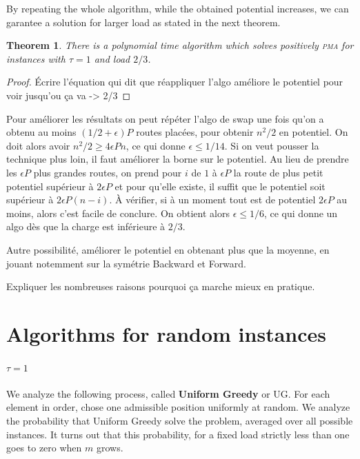 \documentclass[10pt, conference, letterpaper]{IEEEtran}
\newtheorem{theorem}{Theorem}
\newcommand\pma{\textsc{pma}\xspace}
\begin{document}
By repeating the whole algorithm, while the obtained potential increases,
we can garantee a solution for larger load as stated in the next theorem.

\begin{theorem}
There is a polynomial time algorithm which solves positively \pma for instances with $\tau =1$ and load $2/3$. 
\end{theorem}
\begin{proof}
Écrire l'équation qui dit que réappliquer l'algo améliore le potentiel pour voir jusqu'ou
ça va -> 2/3

\end{proof}
Pour améliorer les résultats on peut répéter l'algo de swap une fois qu'on a obtenu 
au moins $(1/2 + \epsilon)P$ routes placées, pour obtenir $n^2/2$ en potentiel. 
On doit alors avoir $n^2/2 \geq 4\epsilon P n$, ce qui donne $\epsilon \leq 1/14$.
Si on veut pousser la technique plus loin, il faut améliorer la borne sur le potentiel.
Au lieu de prendre les $\epsilon P$ plus grandes routes, on prend pour $i$ de $1$
à $\epsilon P$ la route de plus petit potentiel supérieur à $2 \epsilon P$ et 
pour qu'elle existe, il suffit que le potentiel soit supérieur à $2\epsilon P (n -i)$.
À vérifier, si à un moment tout est de potentiel $2 \epsilon P$ au moins, alors 
c'est facile de conclure. On obtient alors $\epsilon \leq 1/6$, ce qui donne un algo
dès que la charge est inférieure à $2/3$.

Autre possibilité, améliorer le potentiel en obtenant plus que la moyenne, en jouant notemment sur la symétrie Backward et Forward.

Expliquer les nombreuses raisons pourquoi ça marche mieux en pratique.




\section{Algorithms for random instances}

\paragraph{$\tau = 1$}

We analyze the following process, called \textbf{Uniform Greedy} or UG.
For each element in order, chose one admissible position
uniformly at random. We analyze the probability that Uniform Greedy
solve the problem, averaged over all possible instances. 
It turns out that this probability, for a fixed load strictly less than one goes to zero when $m$ grows. 
\end{document}
